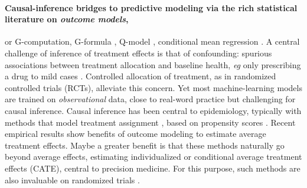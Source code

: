 \documentclass{report}
\begin{document}

\paragraph{Causal-inference bridges to predictive modeling via the rich statistical literature on \emph{outcome
    models},} or G-computation, G-formula \citep{robins_role_1986}, Q-model \citep{snowden_implementation_2011}, conditional
mean regression \citep{wendling_comparing_2018}. A central challenge of inference of treatment effects is that of
confounding: spurious associations between treatment allocation and baseline health, \emph{eg} only prescribing a drug
to mild cases \citep{hernan_causal_2020,vanderweele2019principles}. Controlled allocation of treatment, as in randomized
controlled trials (RCTs), alleviate this concern. Yet most machine-learning models are trained on \emph{observational}
data, close to real-word practice \citep{black1996we,hernan_methods_2021} but challenging for causal inference. Causal
inference has been central to epidemiology, typically with methods that model treatment assignment
\citep{austin_moving_2015,grose_use_2020}, based on propensity scores \citep{rosenbaum_central_1983}. Recent empirical
results \citep{wendling_comparing_2018,dorie_automated_2019} show benefits of outcome modeling to estimate average
treatment effects. Maybe a greater benefit is that these methods naturally go beyond average effects, estimating
individualized or conditional average treatment effects (CATE), central to precision medicine.
%
For this purpose, such methods are also invaluable on randomized trials
\citep{su2018random,lamont2018identification,hoogland2021tutorial}.
\end{document}
